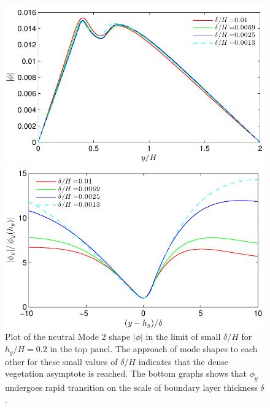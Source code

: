 \documentclass[12pt]{report}   %
\newcommand{\hg}{h_g}
\begin{document}
\begin{figure}
 \centerline{\includegraphics{IsotropicAsymptoticNoshear}} 
 \centerline{\includegraphics{IsotropicAsymptoticPhiyNoshear}}
 \caption{
Plot of the neutral Mode 2 shape $|\phi|$ in the limit of small $\delta/H$ for $\hg/H=0.2$ in the top panel.
The approach of mode shapes to each other for these small values of $\delta/H$ indicates that the dense vegetation asymptote is reached. 
The bottom graphs shows that $\phi_y$ undergoes rapid transition on the scale of boundary layer thickness $\delta$.
}
\label{IsotropicAsymptotic_mode}
\end{figure}
\end{document}
